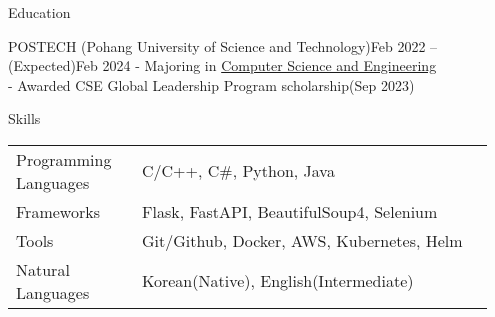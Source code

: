 \documentclass{resume}
\begin{document}
\begin{rSection}{Education}
    \begin{rSubsection}{POSTECH (Pohang University of Science and Technology)}{Feb 2022 -- (Expected)Feb 2024}
        - Majoring in \href{https://cse.postech.ac.kr}{Computer Science and Engineering} \\
        - Awarded CSE Global Leadership Program scholarship(Sep 2023)
    \end{rSubsection}
\end{rSection}

\begin{rSection}{Skills}
    \begin{tabular}{@{}p{0.25\linewidth}p{0.7\linewidth}}
        Programming Languages
            & C/C++, C\#, Python, Java \\ [0.3em]

        Frameworks
            & Flask, FastAPI, BeautifulSoup4, Selenium \\ [0.3em]

        Tools
            & Git/Github, Docker, AWS, Kubernetes, Helm \\ [0.3em]

        Natural Languages
            & Korean(Native), English(Intermediate)
    \end{tabular}
\end{rSection}
\end{document}
